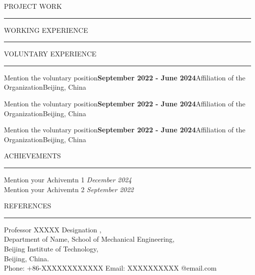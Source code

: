 \documentclass{resume} %
\renewenvironment{rSection}[1]{
\sectionskip
\textcolor{RoyalPurple}{\MakeUppercase{#1}}
\sectionlineskip
\hrule
\begin{list}{}{
\setlength{\leftmargin}{1.5em}
}
\item[]
}{
\end{list}
}
\begin{document}
\begin{rSection}{Project Work}
\begin{rSection}{Working Experience}
\end{rSection}




\begin{rSection}{Voluntary Experience}

\begin{rSubsection}{Mention the voluntary position}{\textbf{September 2022 - June 2024}}{Affiliation of the Organization}{Beijing, China}
\end{rSubsection}

\begin{rSubsection}{Mention the voluntary position}{\textbf{September 2022 - June 2024}}{Affiliation of the Organization}{Beijing, China}
\end{rSubsection}

\begin{rSubsection}{Mention the voluntary position}{\textbf{September 2022 - June 2024}}{Affiliation of the Organization}{Beijing, China}
\end{rSubsection}

\end{rSection}






\begin{rSection}{Achievements} \itemsep -2pt

{Mention your Achivemtn 1 }\hfill {\em December 2024} \\
{Mention your Achivemtn 2 }\hfill {\em September 2022} \\

\end{rSection}



\begin{rSection}{References}

\begin{rSubsection}{Professor XXXXX }{}{Designation ,\\
Department of Name, School of Mechanical Engineering,\\
Beijing Institute of Technology,\\
Beijing, China.\\
Phone: +86-XXXXXXXXXXXX}
{Email: XXXXXXXXXX @email.com}
\end{rSubsection}


\end{rSection}
\end{rSection}
\end{document}

